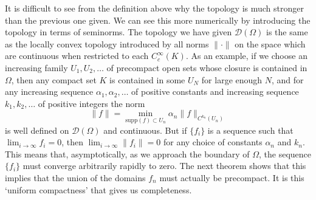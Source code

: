 It is difficult to see from the definition above why the topology is much stronger than the previous one given. We can see this more numerically by introducing the topology in terms of seminorms. The topology we have given $\mathcal{D}(\Omega)$ is the same as the locally convex topology introduced by all norms $\| \cdot \|$ on the space which are continuous when restricted to each $C_c^\infty(K)$. As an example, if we choose an increasing family $U_1, U_2, \dots$ of precompact open sets whose closure is contained in $\Omega$, then any compact set $K$ is contained in some $U_N$ for large enough $N$, and for any increasing sequence $\alpha_1, \alpha_2, \dots$ of positive constants and increasing sequence $k_1, k_2, \dots$ of positive integers the norm
%
\[ \| f \| = \min_{\text{supp}(f) \subset U_n} \alpha_n \| f \|_{C^{k_n}(U_n)} \]
%
is well defined on $\mathcal{D}(\Omega)$ and continuous. But if $\{ f_i \}$ is a sequence such that $\lim_{i \to \infty} f_i = 0$, then $\lim_{i \to \infty} \| f_i \| = 0$ for any choice of constants $\alpha_n$ and $k_n$. This means that, asymptotically, as we approach the boundary of $\Omega$, the sequence $\{ f_i \}$ must converge arbitrarily rapidly to zero. The next theorem shows that this implies that the union of the domains $f_n$ must actually be precompact. It is this `uniform compactness' that gives us completeness.

